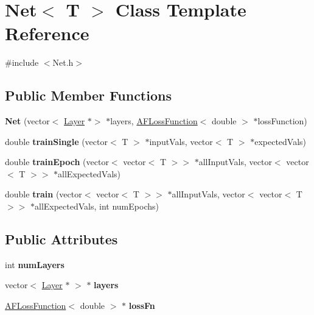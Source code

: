 \hypertarget{classNet}{}\section{Net$<$ T $>$ Class Template Reference}
\label{classNet}


{\ttfamily \#include $<$Net.\+h$>$}

\subsection*{Public Member Functions}
\begin{DoxyCompactItemize}
\item 
\mbox{\label{classNet_a6885fd3c6502592b2ba34c84f69d28e2}} 
{\bfseries Net} (vector$<$ \hyperlink{classLayer}{Layer} $\ast$$>$ $\ast$layers, \hyperlink{classAFLossFunction}{A\+F\+Loss\+Function}$<$ double $>$ $\ast$loss\+Function)
\item 
\mbox{\label{classNet_a539b8a5584c3226381a5aeff1856a4d1}} 
double {\bfseries train\+Single} (vector$<$ T $>$ $\ast$input\+Vals, vector$<$ T $>$ $\ast$expected\+Vals)
\item 
\mbox{\label{classNet_a26df53077f4d20578a10ad53b2d2a350}} 
double {\bfseries train\+Epoch} (vector$<$ vector$<$ T $>$$>$ $\ast$all\+Input\+Vals, vector$<$ vector$<$ T $>$$>$ $\ast$all\+Expected\+Vals)
\item 
\mbox{\label{classNet_ab2af642591b9445752a1359cdde3ac5b}} 
double {\bfseries train} (vector$<$ vector$<$ T $>$$>$ $\ast$all\+Input\+Vals, vector$<$ vector$<$ T $>$$>$ $\ast$all\+Expected\+Vals, int num\+Epochs)
\end{DoxyCompactItemize}
\subsection*{Public Attributes}
\begin{DoxyCompactItemize}
\item 
\mbox{\label{classNet_aa2ef9eb09a4ab5fe674365401639effd}} 
int {\bfseries num\+Layers}
\item 
\mbox{\label{classNet_a915d9d7ce0ef4fb44961b22a11acce23}} 
vector$<$ \hyperlink{classLayer}{Layer} $\ast$ $>$ $\ast$ {\bfseries layers}
\item 
\mbox{\label{classNet_ab225fc71acaf5586f22d6f7b5cc7bd36}} 
\hyperlink{classAFLossFunction}{A\+F\+Loss\+Function}$<$ double $>$ $\ast$ {\bfseries loss\+Fn}
\end{DoxyCompactItemize}



